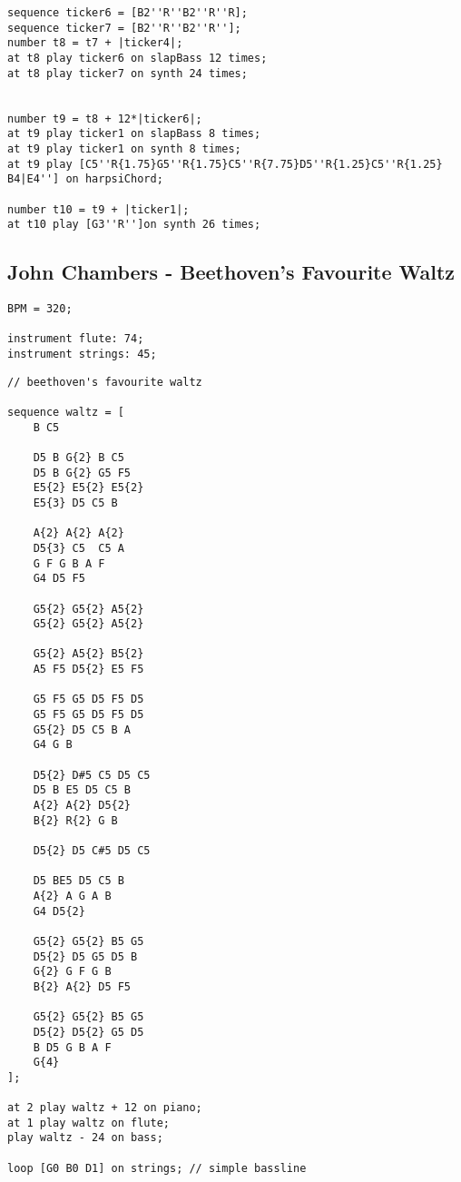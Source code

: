 \documentclass{article}
\begin{document}
\begin{lstlisting}[caption=StrangerThings.mux]
sequence ticker6 = [B2''R''B2''R''R];
sequence ticker7 = [B2''R''B2''R''];
number t8 = t7 + |ticker4|;
at t8 play ticker6 on slapBass 12 times;
at t8 play ticker7 on synth 24 times;


number t9 = t8 + 12*|ticker6|;
at t9 play ticker1 on slapBass 8 times;
at t9 play ticker1 on synth 8 times;
at t9 play [C5''R{1.75}G5''R{1.75}C5''R{7.75}D5''R{1.25}C5''R{1.25} B4|E4''] on harpsiChord;

number t10 = t9 + |ticker1|;
at t10 play [G3''R'']on synth 26 times;

\end{lstlisting}

\clearpage
\subsection{John Chambers - Beethoven's Favourite Waltz}
\begin{lstlisting}[caption=waltz.aux]
BPM = 320;

instrument flute: 74;
instrument strings: 45;
\end{lstlisting}

\begin{lstlisting}[caption=waltz.mux]
// beethoven's favourite waltz

sequence waltz = [
	B C5 

	D5 B G{2} B C5
	D5 B G{2} G5 F5 
	E5{2} E5{2} E5{2}
	E5{3} D5 C5 B

	A{2} A{2} A{2}  
	D5{3} C5  C5 A 
	G F G B A F 
	G4 D5 F5

	G5{2} G5{2} A5{2}  
	G5{2} G5{2} A5{2} 

	G5{2} A5{2} B5{2} 
	A5 F5 D5{2} E5 F5 

	G5 F5 G5 D5 F5 D5  
	G5 F5 G5 D5 F5 D5  
	G5{2} D5 C5 B A 
	G4 G B

	D5{2} D#5 C5 D5 C5  
	D5 B E5 D5 C5 B 
	A{2} A{2} D5{2}  
	B{2} R{2} G B

	D5{2} D5 C#5 D5 C5 

	D5 BE5 D5 C5 B 
	A{2} A G A B 
	G4 D5{2}

	G5{2} G5{2} B5 G5  
	D5{2} D5 G5 D5 B 
	G{2} G F G B 
	B{2} A{2} D5 F5

	G5{2} G5{2} B5 G5  
	D5{2} D5{2} G5 D5  
	B D5 G B A F 
	G{4}
];

at 2 play waltz + 12 on piano;
at 1 play waltz on flute;
play waltz - 24 on bass;

loop [G0 B0 D1] on strings; // simple bassline
\end{lstlisting}
\end{document}
